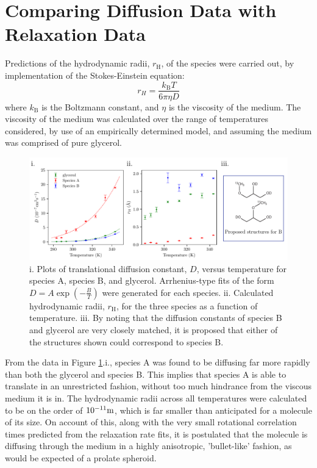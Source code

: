 \section{Comparing Diffusion Data with Relaxation Data}
Predictions of the hydrodynamic radii, $r_{\text{H}}$, of the species were carried out, by implementation of the Stokes-Einstein equation:
\begin{equation}
\label{Stokes}
r_{H} = \frac{k_{\text{B}}T}{6\pi \eta D}
\end{equation}
where $k_{\text{B}}$ is the Boltzmann constant, and $\eta$ is the viscosity of the medium. The viscosity of the medium was calculated over the range of temperatures considered, by use of an empirically determined model, and assuming the medium was comprised of pure glycerol\cite{RN52}.\\
\begin{figure}
\centering
\includegraphics[scale=0.7]{./Figures/SimonsFigs/Diffusion.pdf}
\caption{i. Plots of translational diffusion constant, $D$, versus temperature for species A, species B, and glycerol. Arrhenius-type fits of the form $D = A\exp(-\frac{B}{T})$ were generated for each species. ii. Calculated hydrodynamic radii, $r_{\text{H}}$, for the three species as a function of temperature. iii. By noting that the diffusion constants of species B and glycerol are very closely matched, it is proposed that either of the structures shown could correspond to species B.}
\label{Diffusion}
\end{figure}
From the data in Figure \ref{Diffusion}.i., species A was found to be diffusing far more rapidly than both the glycerol and species B. This implies that species A is able to translate in an unrestricted fashion, without too much hindrance from the viscous medium it is in. The hydrodynamic radii across all temperatures were calculated to be on the order of $\num{E-11} \si{\meter}$, which is far smaller than anticipated for a molecule of its size. On account of this, along with the very small rotational correlation times predicted from the relaxation rate fits, it is postulated that the molecule is diffusing through the medium in a highly anisotropic, 'bullet-like' fashion, as would be expected of a prolate spheroid.\\
